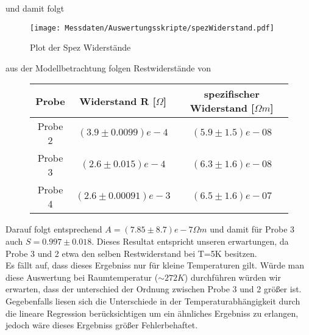     und damit folgt
    \begin{figure}[H]
        \centering
        \texttt{[image: Messdaten/Auswertungsskripte/spezWiderstand.pdf]}
        \caption{Plot der Spez Widerstände}
        \label{spec resistance plot}
    \end{figure}
    aus der Modellbetrachtung folgen Restwiderstände von
    \begin{figure}[H]
        \centering
        \begin{tabular}{c|c|c}
            Probe & Widerstand R [$\Omega$] &spezifischer Widerstand [$\Omega m$] \\
            \hline
            Probe 2 & $(3.9\pm 0.0099)e-4 $ & $(5.9\pm 1.5)e-08$ \\
            Probe 3 & $(2.6\pm 0.015)e-4 $ & $(6.3\pm 1.6)e-08$ \\
            Probe 4 & $(2.6\pm 0.00091)e-3 $ & $(6.5\pm 1.6)e-07$ \\
        \end{tabular}
    \end{figure}
    Darauf folgt entsprechend $A=(7.85\pm8.7)e-7 \Omega m$ und damit für Probe 3 auch $S=0.997 \pm 0.018$. Dieses Resultat
    entspricht unseren erwartungen, da Probe 3 und 2 etwa den selben Restwiderstand bei T=5K besitzen.\\
    Es fällt auf, dass dieses Ergebniss nur für kleine Temperaturen gilt. Würde man diese Auswertung bei
    Raumtemperatur ($\sim 272K$) durchführen würden wir erwarten, dass der unterschied der Ordnung zwischen Probe
    3 und 2 größer ist. Gegebenfalls liesen sich die Unterschiede in der Temperaturabhängigkeit durch die lineare
    Regression berücksichtigen um ein ähnliches Ergebniss zu erlangen, jedoch wäre dieses Ergebniss größer Fehlerbehaftet.